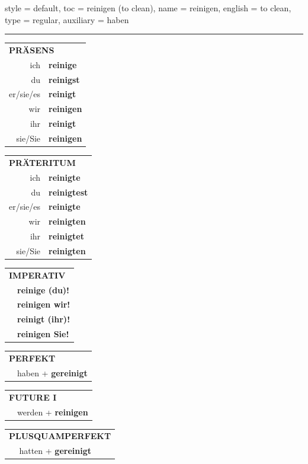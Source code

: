 \begin{verbentry}{
  style = {default},
  toc = {reinigen (to clean)},
  name = {reinigen},
  english = {to clean},
  type = {regular},
  auxiliary = {haben}
}


\vspace{5pt}
\hrule
\vspace{5pt}

\begin{tabular}{rl}
\multicolumn{2}{l}{\textbf{PRÄSENS}}\\
ich & \textbf{reinige}\\
du & \textbf{reinigst}\\
er/sie/es & \textbf{reinigt}\\
wir & \textbf{reinigen}\\
ihr & \textbf{reinigt}\\
sie/Sie & \textbf{reinigen}\\
\end{tabular}
\hfill
\begin{tabular}{rl}
\multicolumn{2}{l}{\textbf{PRÄTERITUM}}\\
ich & \textbf{reinigte}\\
du & \textbf{reinigtest}\\
er/sie/es & \textbf{reinigte}\\
wir & \textbf{reinigten}\\
ihr & \textbf{reinigtet}\\
sie/Sie & \textbf{reinigten}\\
\end{tabular}
\hfill
\begin{tabular}{rl}
\multicolumn{2}{l}{\textbf{IMPERATIV}}\\
& \textbf{reinige (du)!}\\
& \textbf{reinigen wir!}\\
& \textbf{reinigt (ihr)!}\\
& \textbf{reinigen Sie!}\\
\end{tabular}

\vspace{10pt}

\begin{tabular}{rl}
\multicolumn{2}{l}{\textbf{PERFEKT}}\\
& haben + \textbf{gereinigt}\\
\end{tabular}
\hfill
\begin{tabular}{rl}
\multicolumn{2}{l}{\textbf{FUTURE I}}\\
& werden + \textbf{reinigen}\\
\end{tabular}
\hfill
\begin{tabular}{rl}
\multicolumn{2}{l}{\textbf{PLUSQUAMPERFEKT}}\\
& hatten + \textbf{gereinigt}\\
\end{tabular}


\end{verbentry}
